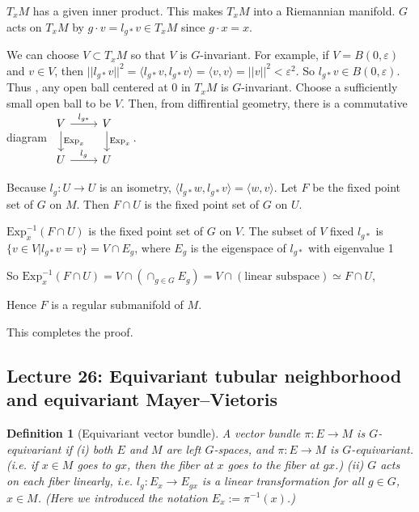 \documentclass{article}
\theoremstyle{mystyle}
\newtheorem*{definition}{Definition}%
\theoremstyle{remark}
\numberwithin{equation}{section}
\begin{document}
$T_xM$ has a given inner product. This makes $T_xM$ into a Riemannian manifold. $G$ acts on $T_xM$ by $g\cdot v = l_{g*} v \in T_xM$ since $g\cdot x = x$.

We can choose $V\subset T_xM$ so that $V$ is $G$-invariant. For example, if $V = B(0,\varepsilon)$ and $v\in V$, then $||l_{g*}v||^2 = \langle l_{g*}v ,l_{g*}v\rangle = \langle v,v\rangle = ||v||^2 <\varepsilon^2$. So $l_{g*}v \in B(0,\varepsilon)$. Thus , any open ball centered at $0$ in $T_xM$ is $G$-invariant. Choose a sufficiently small open ball to be $V$. Then, from diffirential geometry, there is a commutative diagram
$\begin{tikzcd} V \ar[r, "l_{g*}"] \ar[d,"\text{Exp}_x"] & V\ar[d,"\text{Exp}_x"] \\ U\ar[r,"l_g"] & U \end{tikzcd} $. 

Because $l_g\colon U\rightarrow U$ is an isometry, $\langle l_{g*}w,l_{g*}v\rangle = \langle w,v\rangle$. Let $F$ be the fixed point set of $G$ on $M$. Then $F\cap U$ is the fixed point set of $G$ on $U$. 

$\mathrm{Exp}_x^{-1}(F\cap U)$ is the fixed point set of $G$ on $V$. The subset of $V$ fixed $l_{g*}$ is $\{v \in V|l_{g*}v = v\} = V \cap E_g$, where $E_g$ is the eigenspace of $l_{g*}$ with eigenvalue 1

So $\mathrm{Exp}_x^{-1}(F\cap U) = V\cap (\cap_{g \in G}E_g) = V\cap (\text{linear subspace}) \simeq F\cap U$,

Hence $F$ is a regular submanifold of $M$. 

This completes the proof.





\subsection{Lecture 26: Equivariant tubular neighborhood and equivariant Mayer--Vietoris}

\begin{definition}[Equivariant vector bundle]
A vector bundle $\pi\colon E\rightarrow M$ is $G$-equivariant if (i) both $E$ and $M$ are left $G$-spaces, and $\pi\colon E\rightarrow M$ is $G$-equivariant. (i.e. if $x\in M$ goes to $gx$, then the fiber at $x$ goes to the fiber at $gx$.) (ii) $G$ acts on each fiber linearly, i.e. $l_g\colon E_x\rightarrow E_{gx}$ is a linear transformation for all $g\in G$, $x\in M$. (Here we introduced the notation $E_x:=\pi^{-1}(x)$.)
\end{definition}
\end{document}
